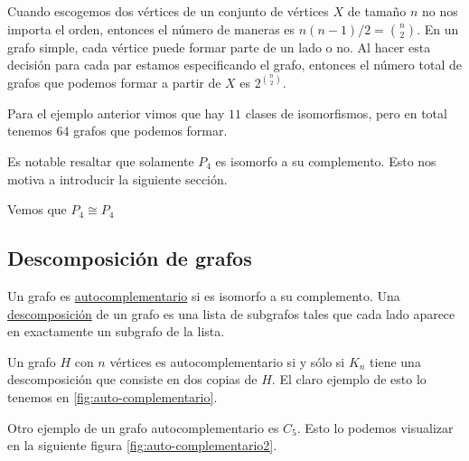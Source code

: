 \begin{ejem}
    Cuando escogemos dos vértices de un conjunto de vértices $X$ de tamaño $n$ no nos importa el orden, entonces el número de maneras es $n(n-1)/2 = \binom{n}{2}$. En un grafo simple, cada vértice puede formar parte de un lado o no. Al hacer esta decisión para cada par estamos especificando el grafo, entonces el número total de grafos que podemos formar a partir de $X$ es $2^{\binom{n}{2}}$.
    
    Para el ejemplo anterior vimos que hay $11$ clases de isomorfismos, pero en total tenemos $64$ grafos que podemos formar.
    
    Es notable resaltar que solamente $P_4$ es isomorfo a su complemento. Esto nos motiva a introducir la siguiente sección.
\end{ejem}

\begin{marginfigure}
    \centering
    \caption{Vemos que $P_4 \cong P_4$}
    \label{fig:auto-complementario}
\end{marginfigure}

\subsection{Descomposición de grafos}

\begin{defn}
    Un grafo es \ul{autocomplementario} si es isomorfo a su complemento. Una \ul{descomposición} de un grafo es una lista de subgrafos tales que cada lado aparece en exactamente un subgrafo de la lista.
    
    Un grafo $H$ con $n$ vértices es autocomplementario si y sólo si $K_n$ tiene una descomposición que consiste en dos copias de $H$. El claro ejemplo de esto lo tenemos en \ref{fig:auto-complementario}.
\end{defn}

\begin{ejem}
    Otro ejemplo de un grafo autocomplementario es $C_5$. Esto lo podemos visualizar en la siguiente figura \ref{fig:auto-complementario2}.
    
    \begin{marginfigure}
        \centering
        \caption{}
        \label{fig:auto-complementario2}
    \end{marginfigure}
\end{ejem}

